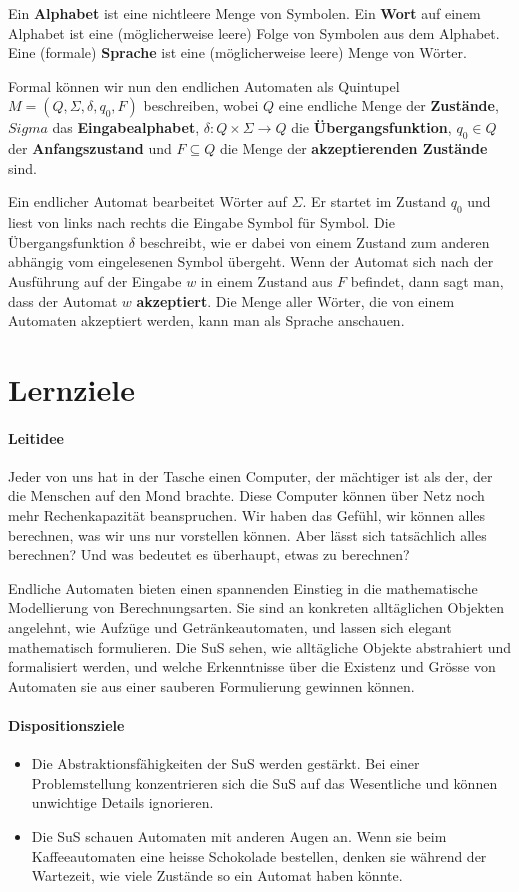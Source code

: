 \documentclass{article}
\begin{document}
Ein \textbf{Alphabet} ist eine nichtleere Menge von Symbolen. Ein \textbf{Wort} auf einem Alphabet ist eine (möglicherweise leere) Folge von Symbolen aus dem Alphabet. Eine (formale) \textbf{Sprache} ist eine (möglicherweise leere) Menge von Wörter.

Formal können wir nun den endlichen Automaten als Quintupel \(M = (Q, \Sigma, \delta, q_0, F)\) beschreiben, wobei \(Q\) eine endliche Menge der \textbf{Zustände}, \(Sigma\) das \textbf{Eingabealphabet}, \(\delta: Q \times \Sigma \rightarrow Q\) die \textbf{Übergangsfunktion}, \(q_0 \in Q \) der \textbf{Anfangszustand} und \(F \subseteq Q\) die Menge der \textbf{akzeptierenden Zustände} sind.

Ein endlicher Automat bearbeitet Wörter auf \(\Sigma\). Er startet im Zustand \(q_0\) und liest von links nach rechts die Eingabe Symbol für Symbol. Die Übergangsfunktion \(\delta\) beschreibt, wie er dabei von einem Zustand zum anderen abhängig vom eingelesenen Symbol übergeht. Wenn der Automat sich nach der Ausführung auf der Eingabe \(w\) in einem Zustand aus \(F\) befindet, dann sagt man, dass der Automat \(w\) \textbf{akzeptiert}. Die Menge aller Wörter, die von einem Automaten akzeptiert werden, kann man als Sprache anschauen.

\section{Lernziele}
\paragraph{Leitidee}
Jeder von uns hat in der Tasche einen Computer, der mächtiger ist als der, der die Menschen auf den Mond brachte. Diese Computer können über Netz noch mehr Rechenkapazität beanspruchen. Wir haben das Gefühl, wir können alles berechnen, was wir uns nur vorstellen können. Aber lässt sich tatsächlich alles berechnen? Und was bedeutet es überhaupt, etwas zu berechnen?

Endliche Automaten bieten einen spannenden Einstieg in die mathematische Modellierung von Berechnungsarten. Sie sind an konkreten alltäglichen Objekten angelehnt, wie Aufzüge und Getränkeautomaten, und lassen sich elegant mathematisch formulieren. Die SuS sehen, wie alltägliche Objekte abstrahiert und formalisiert werden, und welche Erkenntnisse über die Existenz und Grösse von Automaten sie aus einer sauberen Formulierung gewinnen können.

\paragraph{Dispositionsziele}
\begin{itemize}
\item Die Abstraktionsfähigkeiten der SuS werden gestärkt. Bei einer Problemstellung konzentrieren sich die SuS auf das Wesentliche und können unwichtige Details ignorieren.
\item Die SuS schauen Automaten mit anderen Augen an. Wenn sie beim Kaffeeautomaten eine heisse Schokolade bestellen, denken sie während der Wartezeit, wie viele Zustände so ein Automat haben könnte.
\end{itemize}
\end{document}
